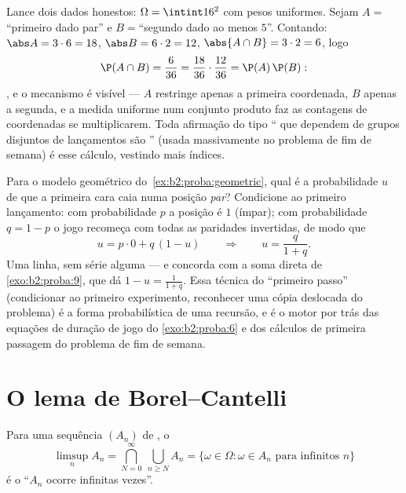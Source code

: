 \begin{example}\label{ex:b2:proba:productindep}
Lance dois dados honestos: $\Omega = \intint16^2$ com pesos
uniformes. Sejam $A = {}$``primeiro dado par'' e $B = {}$``segundo
dado ao menos $5$''. Contando: $\abs A = 3\cdot6 = 18$,
$\abs B = 6\cdot2 = 12$, $\abs{A\cap B} = 3\cdot2 = 6$, logo
\[
\P(A\cap B) = \frac6{36} = \frac{18}{36}\cdot\frac{12}{36} =
\P(A)\,\P(B) :
\]
, e o mecanismo é visível --- $A$ restringe
apenas a primeira coordenada, $B$ apenas a segunda, e a
medida uniforme num conjunto produto faz as contagens de coordenadas
se multiplicarem. Toda afirmação do tipo `` que dependem de
grupos disjuntos de lançamentos são '' (usada massivamente
no problema de fim de semana) é esse cálculo, vestindo mais
índices.
\end{example}

\begin{example}\label{ex:b2:proba:firststep}
Para o modelo geométrico do~\cref{ex:b2:proba:geometric},
qual é a probabilidade $u$ de que a primeira cara caia numa posição
\emph{par}? Condicione ao primeiro lançamento: com probabilidade
$p$ a posição é $1$ (ímpar); com probabilidade $q = 1 - p$ o
jogo recomeça com todas as paridades invertidas, de modo que
\[
u = p\cdot0 + q\,(1 - u)
\qquad\Longrightarrow\qquad
u = \frac{q}{1 + q} .
\]
Uma linha, sem série alguma --- e concorda com a soma
direta de \cref{exo:b2:proba:9}, que dá $1 - u =
\frac1{1+q}$. Essa técnica do ``primeiro passo'' (condicionar ao
primeiro experimento, reconhecer uma cópia deslocada do
problema) é a forma probabilística de uma recursão, e é
o motor por trás das equações de duração de jogo do
\cref{exo:b2:proba:6} e dos cálculos de primeira passagem do
problema de fim de semana.
\end{example}

\section{O lema de Borel--Cantelli}

\begin{definition}\label{def:b2:proba:limsup}
Para uma sequência $(A_n)$ de , o 
\[
\limsup_n A_n
= \bigcap_{N=0}^{\infty}\ \bigcup_{n \geq N} A_n
= \{\omega \in \Omega : \omega \in A_n
\text{ para infinitos } n\}
\]
é o  ``$A_n$ ocorre infinitas vezes''.
\end{definition}


